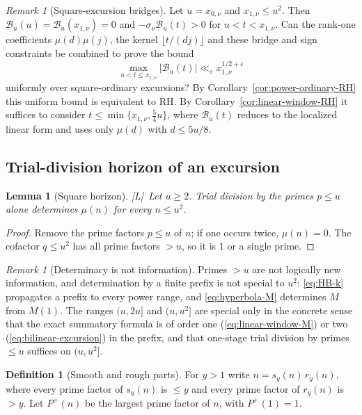 \documentclass[11pt,reqno]{amsart}
\numberwithin{equation}{section}
\theoremstyle{plain}
\newtheorem{lemma}[theorem]{Lemma}
\theoremstyle{definition}
\newtheorem{definition}[theorem]{Definition}
\theoremstyle{remark}
\newtheorem{remark}[theorem]{Remark}
\newcommand{\eps}{\varepsilon}
\newcommand{\Pp}{P^{+}}
\newcommand{\tagL}{\textup{[L]}}
\begin{document}
\begin{remark}[Square-excursion bridges]
\label{q:excursion-constraint}
Let $u=x_{0,\nu}$ and $x_{1,\nu}\le u^2$. Then
$\mathcal B_u(u)=\mathcal B_u(x_{1,\nu})=0$ and
$-\sigma_\nu\mathcal B_u(t)>0$ for $u<t<x_{1,\nu}$. Can the rank-one
coefficients $\mu(d)\mu(j)$, the kernel $\lfloor t/(dj)\rfloor$ and these
bridge and sign constraints be combined to prove the bound
\begin{equation}
\max_{u<t\le x_{1,\nu}}|\mathcal B_u(t)|
\ll_\eps x_{1,\nu}^{1/2+\eps}
\end{equation}
uniformly over square-ordinary excursions? By
Corollary~\ref{cor:power-ordinary-RH} this uniform bound is equivalent to
RH. By Corollary~\ref{cor:linear-window-RH} it suffices to consider
$t\le\min\{x_{1,\nu},\frac54u\}$, where $\mathcal B_u(t)$ reduces to
the localized linear form and uses only $\mu(d)$ with $d\le5u/8$.
\end{remark}


\subsection{Trial-division horizon of an excursion}
\label{sec:prime_horizon}

\begin{lemma}[Square horizon]
\label{lem:square-horizon}
\tagL\ Let $u\ge2$. Trial division by the primes $p\le u$ alone determines $\mu(n)$
for every $n\le u^2$.
\end{lemma}

\begin{proof}
Remove the prime factors $p\le u$ of $n$; if one occurs twice, $\mu(n)=0$.
The cofactor $q\le u^2$ has all prime factors $>u$, so it is $1$ or a single
prime.
\end{proof}

\begin{remark}[Determinacy is not information]
\label{rem:information}
Primes $>u$ are not logically new information, and determination by a
finite prefix is not special to $u^2$: \eqref{eq:HB-k} propagates a prefix
to every power range, and \eqref{eq:hyperbola-M} determines $M$ from $M(1)$.
The ranges $(u,2u]$ and $(u,u^2]$ are special only in the concrete sense
that the exact summatory formula is of order one
(\eqref{eq:linear-window-M}) or two (\eqref{eq:bilinear-excursion}) in the
prefix, and that one-stage trial division by primes $\le u$ suffices on
$(u,u^2]$.
\end{remark}

\begin{definition}[Smooth and rough parts]
\label{def:smooth_rough}
For $y>1$ write $n=s_y(n)\,r_y(n)$, where every prime factor of $s_y(n)$
is $\le y$ and every prime factor of $r_y(n)$ is $>y$. Let $\Pp(n)$ be the
largest prime factor of $n$, with $\Pp(1)=1$.
\end{definition}
\end{document}

